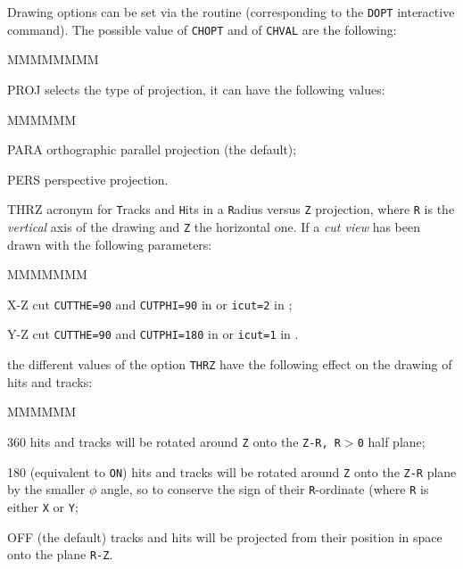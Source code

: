 Drawing options can be set via the routine  
(corresponding to the {\tt DOPT} interactive command).
The possible value of {\tt CHOPT} and of {\tt CHVAL} are the following:
\begin{DLtt}{MMMMMMMM}
\item[PROJ] selects the type of projection, it can have the following
values:
\begin{DLtt}{MMMMMM}
\item[PARA] orthographic parallel projection (the default);
\item[PERS] perspective projection.
\end{DLtt}
\item[THRZ] acronym for {\tt T}racks and {\tt H}its in a {\tt R}adius 
versus {\tt Z} projection, where {\tt R} is the {\it vertical} axis
of the drawing and
{\tt Z} the horizontal one. If a {\it cut view} has been drawn with the
following parameters:
\begin{DLtt}{MMMMMMM}
\item[X-Z cut] {\tt CUTTHE=90} and {\tt CUTPHI=90} in  or
{\tt icut=2} in ;
\item[Y-Z cut] {\tt CUTTHE=90} and {\tt CUTPHI=180} in  or
{\tt icut=1} in .
\end{DLtt}
the different values of the option {\tt THRZ} have the following effect
on the drawing of hits and tracks:
\begin{DLtt}{MMMMMM}
\item[360] hits and tracks will be rotated around {\tt Z} onto the
{\tt Z-R, R$>$0} half plane;
\item[180] (equivalent to {\tt ON}) hits and tracks will be rotated
around {\tt Z} onto the {\tt Z-R} plane by the smaller $\phi$ angle,
so to conserve the sign of their {\tt R}-ordinate (where {\tt R} is
either {\tt X} or {\tt Y};
\item[OFF] (the default) tracks and hits will be projected from their
position in space onto the plane {\tt R-Z}.
\end{DLtt}
 

\end{DLtt}
